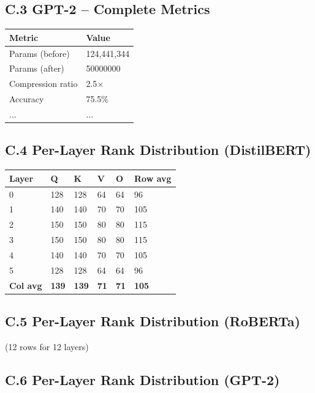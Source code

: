 \subsection{C.3 GPT-2 -- Complete Metrics}

\begin{table}[H]
\centering
\small
\begin{tabular}{ll}
\toprule
\textbf{Metric} & \textbf{Value} \\
\midrule
Params (before) & 124,441,344 \\
Params (after) & 50000000 \\
Compression ratio & 2.5$\times$ \\
Accuracy & 75.5\% \\
... & ... \\
\bottomrule
\end{tabular}
\end{table}

\subsection{C.4 Per-Layer Rank Distribution (DistilBERT)}

\begin{table}[H]
\centering
\small
\begin{tabular}{llllll}
\toprule
\textbf{Layer} & \textbf{Q} & \textbf{K} & \textbf{V} & \textbf{O} & \textbf{Row avg} \\
\midrule
0 & 128 & 128 & 64 & 64 & 96 \\
1 & 140 & 140 & 70 & 70 & 105 \\
2 & 150 & 150 & 80 & 80 & 115 \\
3 & 150 & 150 & 80 & 80 & 115 \\
4 & 140 & 140 & 70 & 70 & 105 \\
5 & 128 & 128 & 64 & 64 & 96 \\
\textbf{Col avg} & \textbf{139} & \textbf{139} & \textbf{71} & \textbf{71} & \textbf{105} \\
\bottomrule
\end{tabular}
\end{table}

\subsection{C.5 Per-Layer Rank Distribution (RoBERTa)}

(12 rows for 12 layers)

\subsection{C.6 Per-Layer Rank Distribution (GPT-2)}

